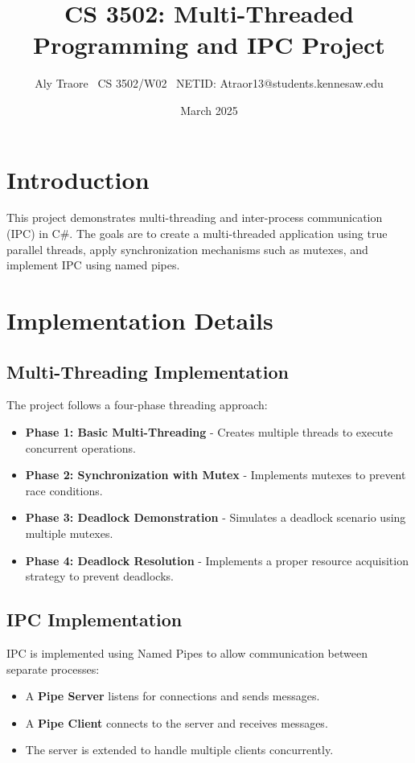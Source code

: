 \documentclass{article}
\title{CS 3502: Multi-Threaded Programming and IPC Project}
\author{Aly Traore \ CS 3502/W02 \ NETID: Atraor13@students.kennesaw.edu}
\date{March 2025}
\begin{document}
\maketitle

\section{Introduction}
This project demonstrates multi-threading and inter-process communication (IPC) in C#. The goals are to create a multi-threaded application using true parallel threads, apply synchronization mechanisms such as mutexes, and implement IPC using named pipes.

\section{Implementation Details}

\subsection{Multi-Threading Implementation}
The project follows a four-phase threading approach:
\begin{itemize}
\item \textbf{Phase 1: Basic Multi-Threading} - Creates multiple threads to execute concurrent operations.
\item \textbf{Phase 2: Synchronization with Mutex} - Implements mutexes to prevent race conditions.
\item \textbf{Phase 3: Deadlock Demonstration} - Simulates a deadlock scenario using multiple mutexes.
\item \textbf{Phase 4: Deadlock Resolution} - Implements a proper resource acquisition strategy to prevent deadlocks.
\end{itemize}

\subsection{IPC Implementation}
IPC is implemented using Named Pipes to allow communication between separate processes:
\begin{itemize}
\item A \textbf{Pipe Server} listens for connections and sends messages.
\item A \textbf{Pipe Client} connects to the server and receives messages.
\item The server is extended to handle multiple clients concurrently.
\end{itemize}
\end{document}
